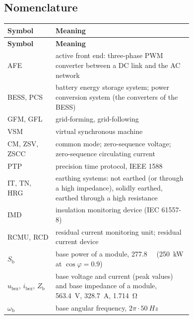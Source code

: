 \documentclass[11pt,a4paper]{scrartcl}
\newcommand{\ped}[1]{_{\mathrm{#1}}}
\begin{document}


\tableofcontents
\listoffigures
\listoftables
\newpage

\begin{onehalfspace}

\section*{Nomenclature}
\label{sec:nomenclature}

\begingroup %
\begin{longtable}{@{} l p{0.74\linewidth} @{}}
	\toprule
	\textbf{Symbol} & \textbf{Meaning} \\
	\midrule
	\endfirsthead
	\toprule
	\textbf{Symbol} & \textbf{Meaning} \\
	\midrule
	\endhead
	\bottomrule
	\endfoot
	\bottomrule
	\endlastfoot
	AFE & active front end: three-phase PWM converter between a DC link and the AC network \\
	BESS, PCS & battery energy storage system; power conversion system (the converters of the BESS) \\
	GFM, GFL & grid-forming, grid-following \\
	VSM & virtual synchronous machine \\
	CM, ZSV, ZSCC & common mode; zero-sequence voltage; zero-sequence circulating current \\
	PTP & precision time protocol, IEEE 1588 \\
	IT, TN, HRG & earthing systems: not earthed (or through a high impedance), solidly earthed, earthed through a high resistance \\
	IMD & insulation monitoring device (IEC 61557-8) \\
	RCMU, RCD & residual current monitoring unit; residual current device \\
	$S\ped{b}$ & base power of a module, \SI{277.8}{\kilo\VA} (\SI{250}{\kilo\watt} at $\cos\varphi = 0.9$) \\
	$u\ped{bez}$, $i\ped{bez}$, $Z\ped{b}$ & base voltage and current (peak values) and base impedance of a module, \SI{563.4}{V}, \SI{328.7}{A}, \SI{1.714}{\ohm} \\
	$\omega\ped{b}$ & base angular frequency, $2\pi\cdot\SI{50}{Hz}$ \\

\end{longtable}
\end{onehalfspace}
\end{document}
